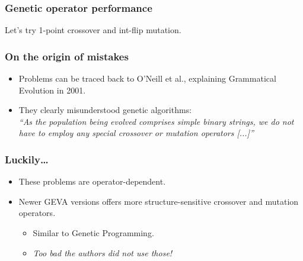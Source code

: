 \documentclass{beamer}
\begin{document}
\begin{frame}
\frametitle{Genetic operator performance}
Let's try 1-point crossover and int-flip mutation.

\vfill


\end{frame}

\begin{frame}
\frametitle{On the origin of mistakes}
\begin{itemize}
\item Problems can be traced back to O'Neill et al., explaining Grammatical Evolution in 2001.
\item They clearly misunderstood genetic algorithms:\\
\textit{``As the population being evolved comprises simple binary
strings, we do not have to employ any special crossover or mutation operators [...]''} \cite{o2001grammatical}
\end{itemize}
\end{frame}

\begin{frame}
\frametitle{Luckily\ldots}
\begin{itemize}
\item These problems are operator-dependent.
\item Newer GEVA versions offers more structure-sensitive crossover and mutation operators.
\begin{itemize}
\item Similar to Genetic Programming.
\item \textit{Too bad the authors did not use those!}
\end{itemize}
\end{itemize}
\end{frame}
\end{document}
